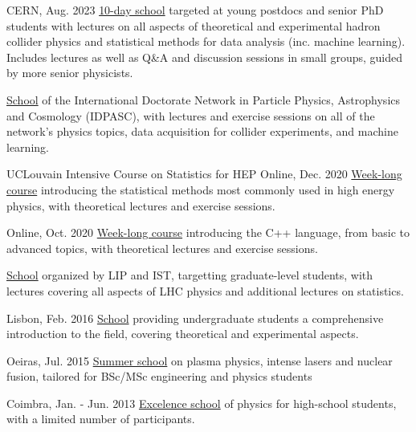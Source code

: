 
\begin{cventries}
    {}{CERN, Aug. 2023}
    {\href{https://indico.cern.ch/event/1234112/}{10-day school} targeted at young postdocs and senior PhD students with lectures on all aspects of theoretical and experimental hadron collider physics and statistical methods for data analysis (inc. machine learning). Includes lectures as well as Q\&A and discussion sessions in small groups, guided by more senior physicists.}\vspace*{2mm}

    {\href{https://indico.lip.pt/event/643}{School} of the International Doctorate Network in Particle Physics, Astrophysics and Cosmology (IDPASC), with lectures and exercise sessions on all of the network's physics topics, data acquisition for collider experiments, and machine learning.}\vspace*{2mm}
    
    \cventry
    {{UCLouvain Intensive Course on Statistics for HEP}}{}
    {}{Online, Dec. 2020}
    {\href{https://agenda.irmp.ucl.ac.be/event/4097/}{Week-long course} introducing the statistical methods most commonly used in high energy physics, with theoretical lectures and exercise sessions.}\vspace*{2mm}
    
    {}{Online, Oct. 2020}
    {\href{https://indico.cern.ch/event/946584}{Week-long course} introducing the C++ language, from basic to advanced topics, with theoretical lectures and exercise sessions.}\vspace*{2mm}
        
    {\href{https://indico.cern.ch/event/997566/}{School} organized by LIP and IST, targetting graduate-level students, with lectures covering all aspects of LHC physics and additional lectures on statistics.}

    {}{Lisbon, Feb. 2016}
    {\href{https://indico.lip.pt/event/206/}{School} providing undergraduate students a comprehensive introduction to the field, covering theoretical and experimental aspects.}\vspace*{2mm}

    {}{Oeiras, Jul. 2015}
    {\href{http://plasmasurf.tecnico.ulisboa.pt/index.html}{Summer school} on plasma physics, intense lasers and nuclear fusion, tailored for BSc/MSc engineering and physics students}

    {}{Coimbra, Jan. - Jun. 2013}
    {\href{https://quark.fis.uc.pt}{Excelence school} of physics for high-school students, with a limited number of participants.}

\end{cventries}

